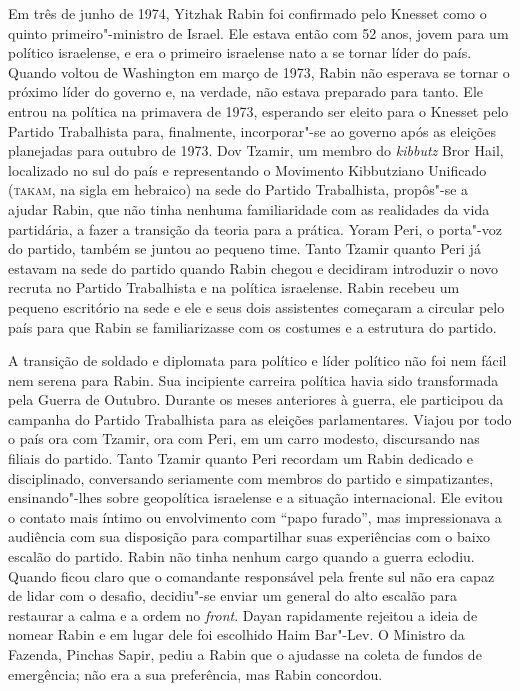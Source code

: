 Em três de junho de 1974, Yitzhak Rabin foi confirmado pelo Knesset como
o quinto primeiro"-ministro de Israel. Ele estava então com 52
anos, jovem para um político israelense, e era o primeiro israelense
nato a se tornar líder do país. Quando voltou de Washington em março de
1973, Rabin não esperava se tornar o próximo líder do governo e, na
verdade, não estava preparado para tanto. Ele entrou na política na
primavera de 1973, esperando ser eleito para o Knesset pelo Partido
Trabalhista para, finalmente, incorporar"-se ao governo após as eleições
planejadas para outubro de 1973. Dov Tzamir, um membro do \emph{kibbutz} Bror
Hail, localizado no sul do país e representando o Movimento Kibbutziano Unificado
(\textsc{takam}, na sigla em hebraico) na sede do Partido
Trabalhista, propôs"-se a ajudar Rabin, que não tinha nenhuma
familiaridade com as realidades da vida partidária, a fazer a transição
da teoria para a prática. Yoram Peri, o porta"-voz do partido, também se
juntou ao pequeno time. Tanto Tzamir quanto Peri já estavam na sede do
partido quando Rabin chegou e decidiram introduzir o novo recruta no
Partido Trabalhista e na política israelense. Rabin recebeu um pequeno
escritório na sede e ele e seus dois assistentes começaram a circular
pelo país para que Rabin se familiarizasse com os costumes e a estrutura
do partido.

A transição de soldado e diplomata para político e líder
político não foi nem fácil nem serena para Rabin. Sua incipiente carreira política
havia sido transformada pela Guerra de Outubro. Durante os meses
anteriores à guerra, ele participou da campanha do Partido Trabalhista
para as eleições parlamentares. Viajou por todo o país ora com Tzamir, ora com
Peri, em um carro modesto, discursando nas filiais do partido. Tanto
Tzamir quanto Peri recordam um Rabin dedicado e disciplinado,
conversando seriamente com membros do partido e simpatizantes,
ensinando"-lhes sobre geopolítica israelense e a situação internacional.
Ele evitou o contato mais íntimo ou envolvimento com ``papo furado'', mas
impressionava a audiência com sua disposição para compartilhar suas
experiências com o baixo escalão do partido. Rabin não tinha nenhum
cargo quando a guerra eclodiu. Quando ficou claro que o comandante
responsável pela frente sul não era capaz de lidar com o desafio,
decidiu"-se enviar um general do alto escalão para restaurar a calma e a
ordem no \emph{front}. Dayan rapidamente rejeitou a ideia de nomear Rabin e em
lugar dele foi escolhido Haim Bar"-Lev. O Ministro da Fazenda, Pinchas
Sapir, pediu a Rabin que o ajudasse na coleta de fundos de emergência;
não era a sua preferência, mas Rabin concordou.

